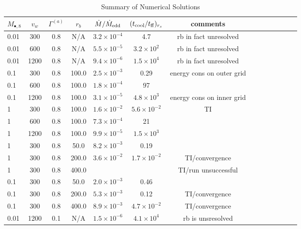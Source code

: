 \documentclass[usenatbib,fleqn]{mn2e}
\begin{document}
\begin{table}
\centering
\begin{minipage}{18cm}
\caption{Summary of Numerical Solutions}
\begin{tabular}{lccccccccccccc}
\hline
{$M_{\bullet,8}$} & {$v_{w}$} & {$\Gamma^{(a)}$} & {$r_b$} & {$\dot{M}/\dot{M}_{\rm edd}$} & {$(t_{\rm cool}/t_{\rm ff})_{r_s}$} & {comments}\\
\hline
0.01 & 300 & 0.8 & N/A & $ 3.2 \times 10^{ -4 }$ & 4.7 & rb in fact
unresolved \\
0.01 & 600 & 0.8 & N/A & $ 5.5 \times 10^{ -5 }$ & $ 3.2 \times
10^{ 2 }$ &  rb in fact unresolved\\
0.01 & 1200 & 0.8 & N/A & $ 9.4 \times 10^{ -6 }$ & $ 1.5 \times
10^{ 4 }$ &  rb in fact unresolved\\
0.1 & 300 & 0.8 & 100.0 & $ 2.5 \times 10^{ -3 }$ & 0.29 & energy
cons on outer grid \\
0.1 & 600 & 0.8 & 100.0 & $ 1.8 \times 10^{ -4 }$ & 97 &  \\
0.1 & 1200 & 0.8 & 100.0 & $ 3.1 \times 10^{ -5 }$ & $ 4.8 \times
10^{ 3 }$ &  energy cons on inner grid\\
1 & 300 & 0.8 & 100.0 & $ 1.6 \times 10^{ -2 }$ & $ 5.6 \times 10^{
  -2 }$ &  TI\\
1 & 600 & 0.8 & 100.0 & $ 7.3 \times 10^{ -4 }$ & 21 &  \\
1 & 1200 & 0.8 & 100.0 & $ 9.9 \times 10^{ -5 }$ & $ 1.5 \times 10^{
  3 }$ &  \\
1 & 300 & 0.8 & 50.0 & $ 8.2 \times 10^{ -3 }$ & 0.19 &  \\
1 & 300 & 0.8 & 200.0 & $ 3.6 \times 10^{ -2 }$ & $ 1.7 \times 10^{
  -2 }$ &  TI/convergence \\
1 & 300 & 0.8 & 400.0 &  &  &  TI/run unsuccessful\\
0.1 & 300 & 0.8 & 50.0 & $ 2.0 \times 10^{ -3 }$ & 0.46 &  \\
0.1 & 300 & 0.8 & 200.0 & $ 5.3 \times 10^{ -3 }$ & 0.12 &  TI/convergence\\
0.1 & 300 & 0.8 & 400.0 & $ 8.9 \times 10^{ -3 }$ & $ 4.7 \times
10^{ -2 }$ & TI/convergence \\
0.01 & 1200 & 0.1 & N/A & $ 1.5 \times 10^{ -6 }$ & $ 4.1 \times
10^{ 4 }$ &  rb is unsresolved\\

\end{tabular}
\end{minipage}
\end{table}
\end{document}

